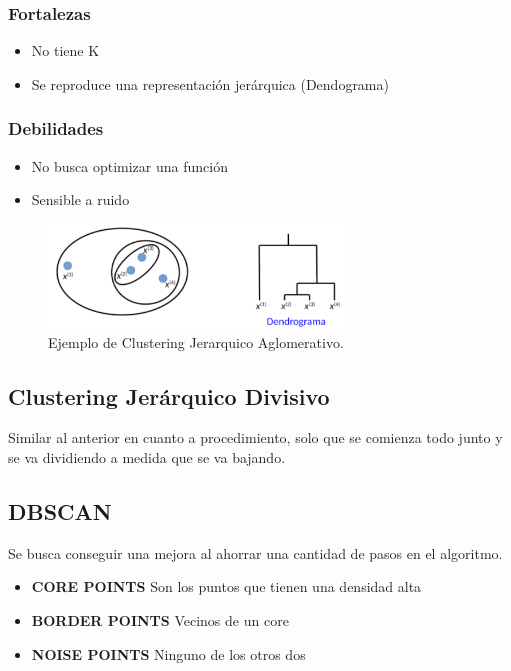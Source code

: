 \documentclass[titlepage,a4paper]{article}
\begin{document}
\subsubsection*{Fortalezas}
\begin{itemize}
    \item No tiene K
    \item Se reproduce una representación jerárquica (Dendograma)
\end{itemize}

\subsubsection*{Debilidades}
\begin{itemize}
    \item No busca optimizar una función
    \item Sensible a ruido
\end{itemize}

\begin{figure}[!htb]
    \centering
    \includegraphics[width=0.7\textwidth]{imagenesResumen/ClusteringJerarquicoAglomerativo.PNG}
    \caption{Ejemplo de Clustering Jerarquico Aglomerativo.}
\end{figure}

\subsection{Clustering Jerárquico Divisivo}
Similar al anterior en cuanto a procedimiento, solo que se comienza todo junto y se va dividiendo a medida que se va bajando.

\subsection{DBSCAN}
Se busca conseguir una mejora al ahorrar una cantidad de pasos en el algoritmo.

\begin{itemize}
    \item \textbf{CORE POINTS} Son los puntos que tienen una densidad alta
    \item \textbf{BORDER POINTS} Vecinos de un core
    \item \textbf{NOISE POINTS} Ninguno de los otros dos
\end{itemize}
\end{document}
